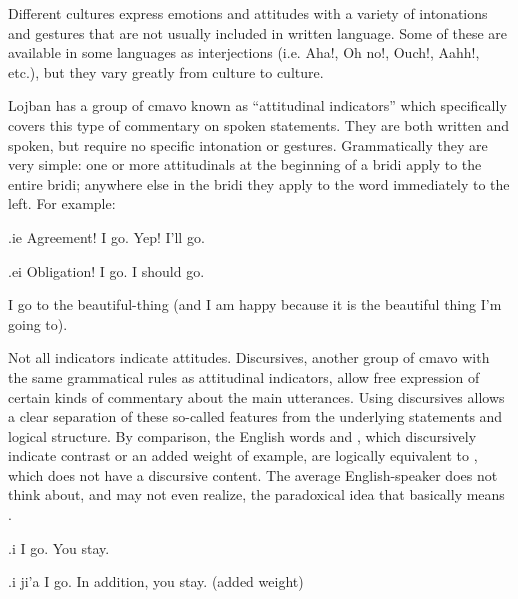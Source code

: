 Different cultures express emotions and attitudes with a variety of intonations and gestures that are not usually included in written language. Some of these are available in some languages as interjections (i.e. Aha!, Oh no!, Ouch!, Aahh!, etc.), but they vary greatly from culture to culture.

Lojban has a group of cmavo known as ``attitudinal indicators'' which specifically covers this type of commentary on spoken statements. They are both written and spoken, but require no specific intonation or gestures. Grammatically they are very simple: one or more attitudinals at the beginning of a bridi apply to the entire bridi; anywhere else in the bridi they apply to the word immediately to the left. For example:
\begin{example}
.ie   \n
Agreement! I go.\n
Yep! I'll go.
\end{example}

\begin{example}
.ei   \n
Obligation! I go.\n
I should go.
\end{example}

\begin{example}
   \n
I go to the beautiful-thing (and I am happy because it is the beautiful thing I'm going to).
\end{example}

Not all indicators indicate attitudes. Discursives, another group of cmavo with the same grammatical rules as attitudinal indicators, allow free expression of certain kinds of commentary about the main utterances. Using discursives allows a clear separation of these so-called  features from the underlying statements and logical structure. By comparison, the English words  and , which discursively indicate contrast or an added weight of example, are logically equivalent to , which does not have a discursive content. The average English-speaker does not think about, and may not even realize, the paradoxical idea that  basically means .
\begin{example}
   .i   \n
I go. You stay.
\end{example}

\begin{example}
   .i ji'a   \n
I go. In addition, you stay. (added weight)
\end{example}

